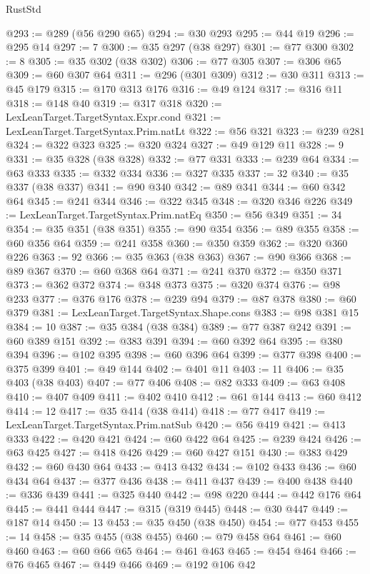 \begin{lexlean}{RustStd}
\begin{coremodule}
@293 := @289 (@56 @290 @65)
@294 := @30 @293
@295 := @44 @19
@296 := @295 @14
@297 := 7
@300 := @35 @297 (@38 @297)
@301 := @77 @300
@302 := 8
@305 := @35 @302 (@38 @302)
@306 := @77 @305
@307 := @306 @65
@309 := @60 @307 @64
@311 := @296 (@301 @309)
@312 := @30 @311
@313 := @45 @179
@315 := @170 @313 @176
@316 := @49 @124
@317 := @316 @11
@318 := @148 @40
@319 := @317 @318
@320 := LexLeanTarget.TargetSyntax.Expr.cond
@321 := LexLeanTarget.TargetSyntax.Prim.natLt
@322 := @56 @321
@323 := @239 @281
@324 := @322 @323
@325 := @320 @324
@327 := @49 @129 @11
@328 := 9
@331 := @35 @328 (@38 @328)
@332 := @77 @331
@333 := @239 @64
@334 := @63 @333
@335 := @332 @334
@336 := @327 @335
@337 := 32
@340 := @35 @337 (@38 @337)
@341 := @90 @340
@342 := @89 @341
@344 := @60 @342 @64
@345 := @241 @344
@346 := @322 @345
@348 := @320 @346 @226
@349 := LexLeanTarget.TargetSyntax.Prim.natEq
@350 := @56 @349
@351 := 34
@354 := @35 @351 (@38 @351)
@355 := @90 @354
@356 := @89 @355
@358 := @60 @356 @64
@359 := @241 @358
@360 := @350 @359
@362 := @320 @360 @226
@363 := 92
@366 := @35 @363 (@38 @363)
@367 := @90 @366
@368 := @89 @367
@370 := @60 @368 @64
@371 := @241 @370
@372 := @350 @371
@373 := @362 @372
@374 := @348 @373
@375 := @320 @374
@376 := @98 @233
@377 := @376 @176
@378 := @239 @94
@379 := @87 @378
@380 := @60 @379
@381 := LexLeanTarget.TargetSyntax.Shape.cons
@383 := @98 @381 @15
@384 := 10
@387 := @35 @384 (@38 @384)
@389 := @77 @387 @242
@391 := @60 @389 @151
@392 := @383 @391
@394 := @60 @392 @64
@395 := @380 @394
@396 := @102 @395
@398 := @60 @396 @64
@399 := @377 @398
@400 := @375 @399
@401 := @49 @144
@402 := @401 @11
@403 := 11
@406 := @35 @403 (@38 @403)
@407 := @77 @406
@408 := @82 @333
@409 := @63 @408
@410 := @407 @409
@411 := @402 @410
@412 := @61 @144
@413 := @60 @412
@414 := 12
@417 := @35 @414 (@38 @414)
@418 := @77 @417
@419 := LexLeanTarget.TargetSyntax.Prim.natSub
@420 := @56 @419
@421 := @413 @333
@422 := @420 @421
@424 := @60 @422 @64
@425 := @239 @424
@426 := @63 @425
@427 := @418 @426
@429 := @60 @427 @151
@430 := @383 @429
@432 := @60 @430 @64
@433 := @413 @432
@434 := @102 @433
@436 := @60 @434 @64
@437 := @377 @436
@438 := @411 @437
@439 := @400 @438
@440 := @336 @439
@441 := @325 @440
@442 := @98 @220
@444 := @442 @176 @64
@445 := @441 @444
@447 := @315 (@319 @445)
@448 := @30 @447
@449 := @187 @14
@450 := 13
@453 := @35 @450 (@38 @450)
@454 := @77 @453
@455 := 14
@458 := @35 @455 (@38 @455)
@460 := @79 @458 @64
@461 := @60 @460
@463 := @60 @66 @65
@464 := @461 @463
@465 := @454 @464
@466 := @76 @465
@467 := @449 @466
@469 := @192 @106 @42

\end{coremodule}
\end{lexlean}
